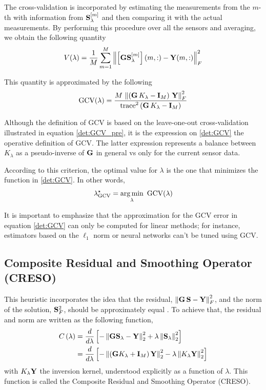The cross-validation is incorporated by estimating the measurements from the $m$-th with information from $\mathbf{S}_\lambda^{[m]}$ and then comparing it with the actual measurements.
%
By performing this procedure over all the sensors and averaging, we obtain the following quantity
\begin{equation}
V(\lambda) = 
\frac{1}{M}
\sum_{m=1}^M
\left\lVert  \left[  \mathbf{G} \mathbf{S}_\lambda^{[m]}  \right](m, :) - \mathbf{Y}(m,:)  \right\rVert_F^2
\label{det:GCV_pre}
\end{equation}

This quantity is approximated by the following
\begin{equation}
\text{GCV}(\lambda) = 
\frac{M\, \left\lVert \left( \mathbf{G}\, K_\lambda -\mathbf{I}_M  \right)\, \mathbf{Y} \right\rVert_F^2}{\text{trace}^2\left( \mathbf{G}\, K_\lambda - \mathbf{I}_M \right)}
\label{det:GCV}
\end{equation}

Although the definition of GCV is based on the leave-one-out cross-validation illustrated in equation \eqref{det:GCV_pre}, it is the expression on \eqref{det:GCV} the operative definition of GCV.
%
The latter expression represents a balance between $K_\lambda$ as a pseudo-inverse of $\mathbf{G}$ in general vs only for the current sensor data.

According to this criterion, the optimal value for $\lambda$ is the one that minimizes the function in \eqref{det:GCV}.
In other words,
\begin{equation}
    \lambda^\star_\text{GCV} = 
    \operatorname*{arg\,min}_\lambda\,\, \text{GCV}(\lambda)
\end{equation}

It is important to emphasize that the approximation for the GCV error in equation \eqref{det:GCV} can only be computed for linear methods; for instance, estimators based on the $\ell_1$ norm or neural networks can't be tuned using GCV.

\subsection{Composite Residual and Smoothing Operator (CRESO)}

This heuristic incorporates the idea that the residual, $\left\lVert \mathbf{G}\, \mathbf{S} - \mathbf{Y} \right\rVert_F^2$, and the norm of the solution, $\mathbf{S}_F^2$, should be approximately equal \cite{creso}.
%
To achieve that, the residual and norm are written as the following function, 
\begin{align}
    C\left( \lambda \right) &= 
\frac{d}{d\lambda} \left[  -\left\lVert \mathbf{G}\mathbf{S}_\lambda - \mathbf{Y} \right\rVert_2^2 + \lambda \left\lVert \mathbf{S}_\lambda \right\rVert_2^2 \right]
\nonumber \\
&=
\frac{d}{d\lambda} \left[  - \left\lVert \left( \mathbf{G} K_\lambda + \mathbf{I}_M \right)\mathbf{Y} \right\rVert_2^2 - \lambda \left\lVert K_\lambda \mathbf{Y} \right\rVert_2^2 \right]
\end{align}
with $K_\lambda \mathbf{Y}$ the inversion kernel, understood explicitly as a function of $\lambda$. 
%
This function is called the Composite Residual and Smoothing Operator (CRESO).

